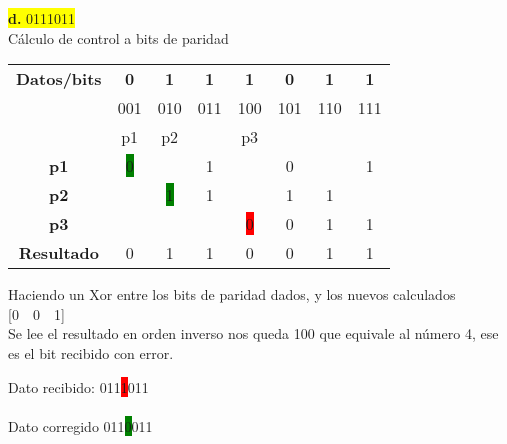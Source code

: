 \documentclass{article}
\begin{document}
	\begin{center}
		\hspace{3cm}\colorbox{yellow}{{\textbf{d.} 0111011}}\newline
		\\Cálculo de control a bits de paridad
		
		\begin{table}[h!]
			\centering
			\begin{tabular}{c|ccccccc}
				\toprule
				\textbf{Datos/bits} & \textbf{0} & \textbf{1} & \textbf{1} & \textbf{1} & \textbf{0} & \textbf{1} & \textbf{1}\\ & \scriptsize001 & \scriptsize010 & \scriptsize011 & \scriptsize100 & \scriptsize101 & \scriptsize110 & \scriptsize111\\
				\midrule
				\textbf{} & p1 & p2 & & p3 & & & \\
				\midrule
				\textbf{p1} & \colorbox{green}{0} & & 1 & & 0 & & 1\\
				\midrule
				\textbf{p2} &  & \colorbox{green}{1} & 1 & & 1 & 1  \\
				\midrule
				\textbf{p3} & & & & \colorbox{red}{0} & 0 & 1 & 1 \\
				\midrule
				\textbf{Resultado} & 0 & 1 & 1 & 0 & 0 & 1 & 1\\
				\bottomrule
			\end{tabular}
		\end{table}
	\end{center}
	
	\begin{center}
		Haciendo un Xor entre los bits de paridad dados, y los nuevos calculados
		\vspace{0.1cm}
		[0~~0~~1]\\
		
		\vspace{0.5cm}
		Se lee el resultado en orden inverso nos queda 100 que equivale al número 4, ese es el bit recibido con error.
	\end{center}
	\vspace{0.3cm}
	Dato recibido: 011\colorbox{red}{1}011\\\\
	Dato corregido 011\colorbox{green}{0}011\\
	
	
	
	
	
	
	
	
	
	
	
	
	
	
	
	
	
	
	
	
	
	
	
	
	
	
	
	
	
	
	
	
	
	
	
	
\end{document}
